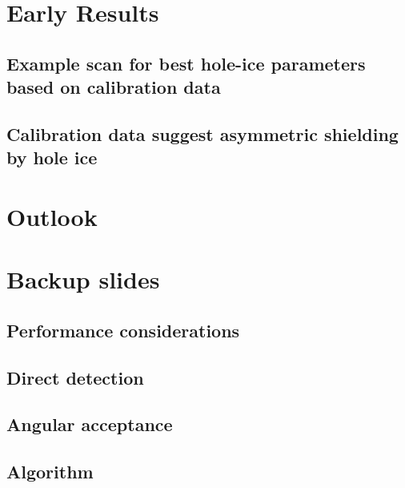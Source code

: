 \documentclass[green, 12pt]{beamer}
\begin{document}
\section{Early Results}
\subsection{Example scan for best hole-ice parameters based on calibration data}
  
\subsection{Calibration data suggest asymmetric shielding by hole ice}
  

\section{Outlook}
  
  

\appendix
\section{Backup slides}
  

\subsection{Performance considerations}
  
  
  

\subsection{Direct detection}
  

\subsection{Angular acceptance}
  
  

\subsection{Algorithm}
  
\end{document}
